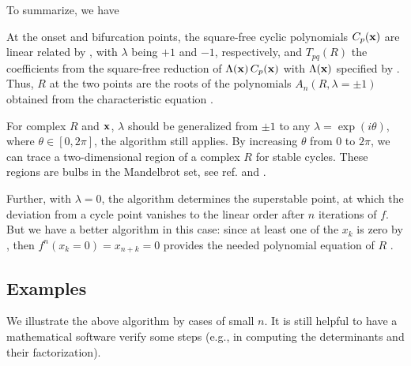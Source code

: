 \documentclass{ws-ijbc}
\begin{document}
To summarize, we have
\begin{theorem}
  At the onset and bifurcation points,
  the square-free cyclic polynomials $C_p(\mathbf{x})$
  are linear related by , with
  $\lambda$ being $+1$ and $-1$, respectively,
  and $T_{pq}(R)$ the coefficients
  from the square-free reduction of $\Lambda(\mathbf{x}) \, C_p(\mathbf{x})$
  with $\Lambda(\mathbf{x})$ specified by .
  Thus, $R$ at the two points are the roots of the
  polynomials $A_n(R, \lambda = \pm1)$
  obtained from the characteristic equation .
  \label{thm:main}
\end{theorem}

\begin{remark}
  For complex $R$ and $\mathbf{x}$,
  $\lambda$ should be generalized from $\pm1$
  to any $\lambda = \exp(i\theta)$,
  where $\theta \in [0, 2\pi]$,
  the algorithm still applies.
  By increasing $\theta$ from 0 to $2\pi$,
  we can trace a two-dimensional region of a complex $R$
  for stable cycles.
  These regions are bulbs in the Mandelbrot set,
  see ref. \cite{stephenson} and .

  Further, with $\lambda = 0$,
  the algorithm determines the superstable point,
  at which the deviation from a cycle point vanishes
  to the linear order after $n$ iterations of $f$.
  But we have a better algorithm in this case:
  since at least one of the $x_k$ is zero by ,
  then $f^n(x_k = 0) = x_{n+k} = 0$ provides
  the needed polynomial equation of $R$ \cite{strogatz}.
\end{remark}





\subsection{\label{sec:examples}Examples}




We illustrate the above algorithm by cases of small $n$.
%
It is still helpful to have a mathematical software verify some steps
  (e.g., in computing the determinants and their factorization).
\end{document}
